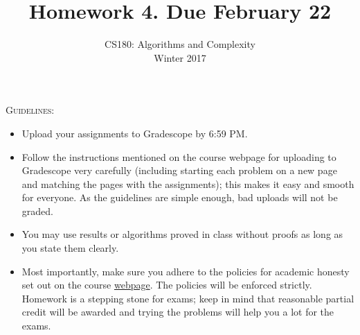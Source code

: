 \documentclass[11pt]{article}
\title{\bf{Homework 4. Due February 22}}
\author{ CS180: Algorithms and Complexity\\Winter 2017}
\date{}
\begin{document}
\maketitle
\begin{mdframed}
\textsc{Guidelines}:
\begin{itemize}
\item Upload your assignments to Gradescope by 6:59 PM. 
\item Follow the instructions mentioned on the course webpage for uploading to Gradescope very carefully (including starting each problem on a new page and matching the pages with the assignments); this makes it easy and smooth for everyone. As the guidelines are simple enough, bad uploads will not be graded. 
\item You may use results or algorithms proved in class without proofs as long as you state them clearly.
\item Most importantly, make sure you adhere to the policies for academic honesty set out on the course \href{http://cs180.raghumeka.org}{webpage}. The policies will be enforced strictly. Homework is a stepping stone for exams; keep in mind that reasonable partial credit will be awarded and trying the problems will help you a lot for the exams.
\end{itemize}
\end{mdframed}
\end{document}
